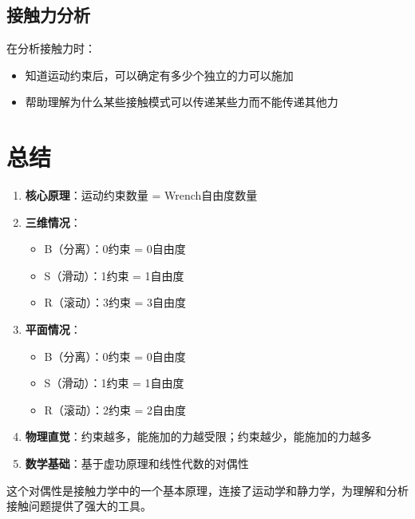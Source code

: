 \documentclass[12pt,a4paper]{article}
\begin{document}
\subsection{接触力分析}

在分析接触力时：
\begin{itemize}
    \item 知道运动约束后，可以确定有多少个独立的力可以施加
    \item 帮助理解为什么某些接触模式可以传递某些力而不能传递其他力
\end{itemize}

\section{总结}

\begin{enumerate}
    \item \textbf{核心原理}：运动约束数量 = Wrench自由度数量
    
    \item \textbf{三维情况}：
    \begin{itemize}
        \item B（分离）：0约束 = 0自由度
        \item S（滑动）：1约束 = 1自由度
        \item R（滚动）：3约束 = 3自由度
    \end{itemize}
    
    \item \textbf{平面情况}：
    \begin{itemize}
        \item B（分离）：0约束 = 0自由度
        \item S（滑动）：1约束 = 1自由度
        \item R（滚动）：2约束 = 2自由度
    \end{itemize}
    
    \item \textbf{物理直觉}：约束越多，能施加的力越受限；约束越少，能施加的力越多
    
    \item \textbf{数学基础}：基于虚功原理和线性代数的对偶性
\end{enumerate}

这个对偶性是接触力学中的一个基本原理，连接了运动学和静力学，为理解和分析接触问题提供了强大的工具。
\end{document}
